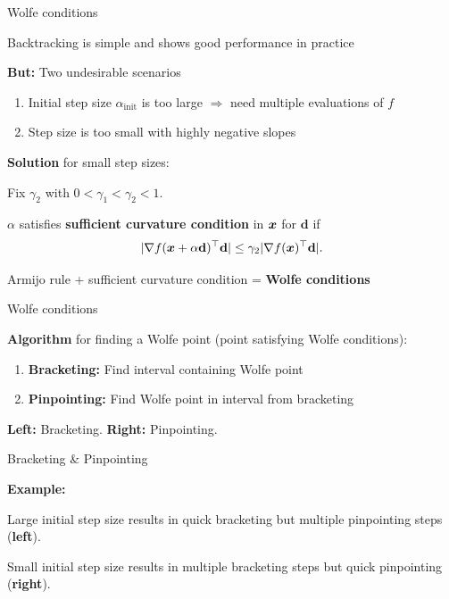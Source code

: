 \documentclass[11pt,compress,t,notes=noshow, xcolor=table]{beamer}
\begin{document}
\begin{framei}{Wolfe conditions}
\item Backtracking is simple and shows good performance in practice
\item \textbf{But:} Two undesirable scenarios
\begin{enumerate}
\item Initial step size $\alpha_{\text{init}}$ is too large $\Rightarrow$ need multiple evaluations of $f$
\item Step size is too small with highly negative slopes
\end{enumerate}
\item\textbf{Solution} for small step sizes:
\begin{itemizeM}
\item Fix $\gamma_2$ with $0 < \gamma_1 < \gamma_2 < 1$.
\item $\alpha$ satisfies \textbf{sufficient curvature condition} in $\bm{x}$ for $\mathbf{d}$ if
$$| \nabla f(\bm{x} + \alpha \mathbf{d})^\top \mathbf{d} | \leq \gamma_2 | \nabla f(\bm{x})^\top \mathbf{d} |.$$
\end{itemizeM}
\begin{framed}
Armijo rule + sufficient curvature condition = \textbf{Wolfe conditions}
\end{framed}
\end{framei}


\begin{framei}{Wolfe conditions}
\item\textbf{Algorithm} for finding a Wolfe point (point satisfying Wolfe conditions):
\begin{enumerate}
\item \textbf{Bracketing:} Find interval containing Wolfe point
\item \textbf{Pinpointing:} Find Wolfe point in interval from bracketing
\end{enumerate}
\splitVTT
{}
{}
\begin{center}{\footnotesize \textbf{Left:} Bracketing. \textbf{Right:} Pinpointing.}\end{center}
\end{framei}


\begin{framei}{Bracketing \& Pinpointing}
\item\textbf{Example:}
\begin{itemizeM}
\item Large initial step size results in quick bracketing but multiple pinpointing steps (\textbf{left}).
\item Small initial step size results in multiple bracketing steps but quick pinpointing (\textbf{right}).
\end{itemizeM}
\vfill
{}
\end{framei}

\endlecture
\end{document}
